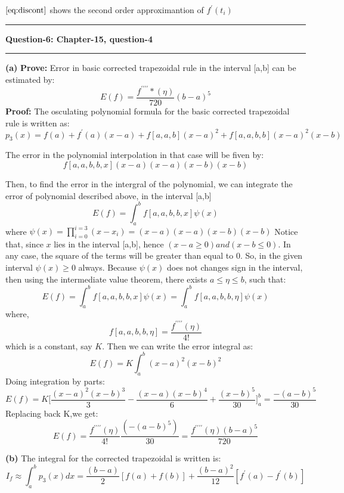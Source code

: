 \documentclass{article}
\newcommand\question[2]{\vspace{.25in}\hrule\textbf{#1: #2}\hrule\vspace{.10in}}
\renewcommand\part[1]{\vspace{.10in}\textbf{(#1)}}
\begin{document}
  $\eqref{eq:discont}$ shows the second order approximantion of $f^\prime(t_i)$



  

  \question{Question-6}{Chapter-15, question-4}
  \part{a} \textbf {Prove:} Error in basic corrected trapezoidal rule in the interval [a,b] can be estimated by:
  \[E(f) = \dfrac{f^{\prime\prime\prime\prime}*(\eta)}{720} (b-a)^5\]
  \textbf {Proof:} The osculating polynomial formula for the basic corrected trapezoidal rule is written as:
  \[p_3(x) = f(a) + f^\prime(a)(x-a) + f[a,a,b](x-a)^2 + f[a,a,b,b](x-a)^2(x-b)\]

  The error in the polynomial interpolation in that case will be fiven by:
  \[f[a,a,b,b,x](x-a)(x-a)(x-b)(x-b)\]

  Then, to find the error in the intergral of the polynomial, we can integrate the error of polynomial described above, in the interval [a,b]
  \[E(f) = \int_{a}^{b} f[a,a,b,b,x]\psi(x)\]
  where $\psi(x) = \prod_{i=0}^{i=3}(x - x_i) = (x-a)(x-a)(x-b)(x-b)$ \newline
  Notice that, since $x$ lies in the interval [a,b], hence $(x-a \geq 0) and (x-b \leq 0)$. In any case, the square of the terms will be greater than equal to 0. So, in the given interval $\psi(x) \geq 0$ always. Because $\psi(x)$ does not changes sign in the interval, then using the intermediate value theorem, there exists $a \leq \eta \leq b$, such that:
  \[E(f) = \int_{a}^{b} f[a,a,b,b,x]\psi(x) = \int_{a}^{b} f[a,a,b,b,\eta]\psi(x)\]
  where,
  \[f[a,a,b,b,\eta] = \dfrac{f^{\prime\prime\prime\prime}(\eta)}{4!}\]
  which is a constant, say $K$. \newline
  Then we can write the error integral as:
  \[E(f) = K \int_{a}^{b} (x-a)^2(x-b)^2 \]
  Doing integration by parts:
  \[E(f) = K\bigg [ \dfrac{(x-a)^2(x-b)^3}{3} - \dfrac{(x-a)(x-b)^4}{6} + \dfrac{(x - b)^5}{30}    \bigg ]_{a}^{b} = \dfrac{-(a-b)^5}{30}\]
  Replacing back K,we get:
  \[E(f) = \dfrac{f^{\prime\prime\prime\prime}(\eta)}{4!}\dfrac{(-(a-b)^5)}{30} = \dfrac{f^{\prime\prime\prime\prime}(\eta)(b-a)^5}{720} \]

  \part{b} The integral for the corrected trapezoidal is written is:
  \[ I_f \approx \int_{a}^{b} p_3(x)dx = \dfrac{(b-a)}{2}[f(a) + f(b)] + \dfrac{(b-a)^2}{12}[f^\prime(a) - f^\prime(b)] \]
\end{document}
